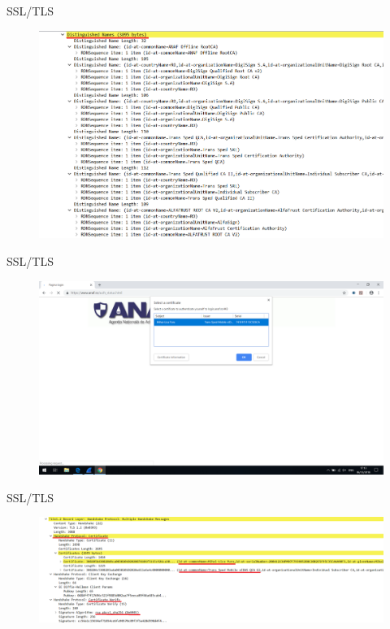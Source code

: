 \documentclass[pdf]{beamer}
\begin{document}
\begin{frame}{SSL/TLS}

\begin{figure}[t]
\centering
\includegraphics[scale=0.6]{Images/tls5c}
\end{figure}

\end{frame}



\begin{frame}{SSL/TLS}

\begin{figure}[t]
\centering
\includegraphics[scale=0.28]{Images/tls5d}
\end{figure}

\end{frame}



\begin{frame}{SSL/TLS}

\begin{figure}[t]
\centering
\includegraphics[scale=0.5]{Images/tls6}
\end{figure}

\end{frame}
\end{document}
